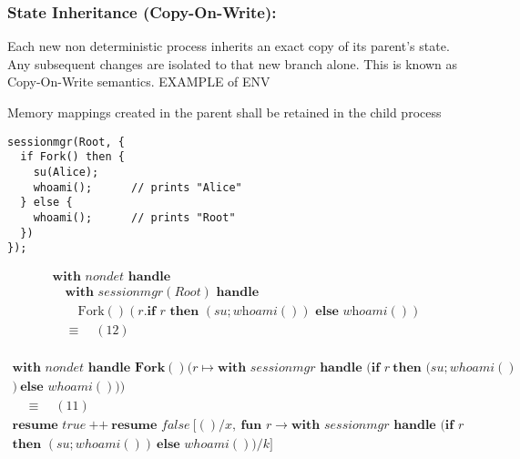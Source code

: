 \documentclass[logo,bsc,singlespacing,parskip]{infthesis}
\begin{document}
    
\subsubsection{State Inheritance (Copy-On-Write):} Each new non deterministic process inherits an exact copy of its parent’s state. Any subsequent changes are isolated to that new branch alone. This is known as Copy-On-Write semantics. EXAMPLE of ENV

\begin{tcolorbox}[colback=gray!10, colframe=gray!60, sharp corners, boxrule=0.5pt, title={POSIX Base Specifications, Issue 7, p.897}]
Memory mappings created in the parent shall be retained in the child process
\end{tcolorbox}


\begin{tcolorbox}[examplebox, title=Practical Example: Inheriting environment variables]

\begin{lstlisting}
sessionmgr(Root, {
  if Fork() then {
    su(Alice);
    whoami();      // prints "Alice"
  } else {
    whoami();      // prints "Root"
  })
});
\end{lstlisting}

\[
\begin{array}{l}
\textbf{with } \mathit{nondet} \textbf{ handle } \\
\quad \textbf{with } \mathit{sessionmgr(Root)} \textbf{ handle } \\
\quad\quad \text{Fork}()(r. \textbf{if } r \textbf{ then } (su; \textit{whoami}()) \textbf{ else } \textit{whoami}()) \\[5pt]
\quad\equiv\quad (12) \\
\end{array}
\]

\[
\begin{array}{l}
\textbf{with } \mathit{nondet} \textbf{ handle } \textbf{Fork}()(r \mapsto \textbf{with } \mathit{sessionmgr} \textbf{ handle } (\textbf{if } r \ \textbf{then } (su; \mathit{whoami}()\\) \ \textbf{else } \mathit{whoami}())) \\[5pt]

\quad\equiv\quad (11) \\[2pt]
\textbf{resume } \mathit{true} \ \text{++} \ \textbf{resume } \mathit{false} \ [ ()/x,\ \textbf{fun } r \rightarrow \textbf{with } \mathit{sessionmgr} \textbf{ handle } (\textbf{if } r \ \\ \textbf{then } (su; \mathit{whoami}()) \ \textbf{else } \mathit{whoami}()) / k ] \\[5pt]


\end{array}\]
\end{tcolorbox}
\end{document}
